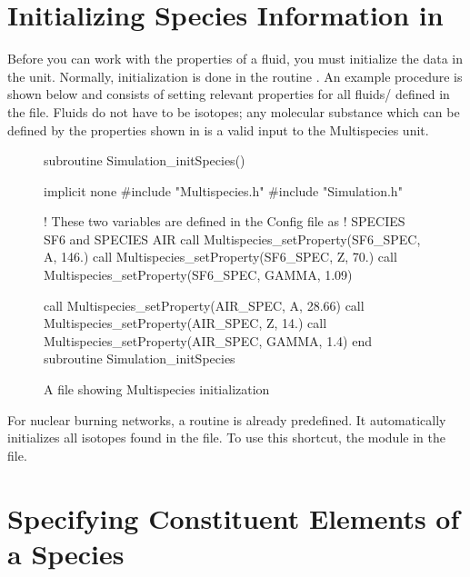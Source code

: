 \section{Initializing Species Information in }
\label{Sec:init_species}
Before you can work with the properties of a fluid, you must
initialize the data in the  unit.  Normally,
initialization is done in the routine
.  An example procedure is
shown below and consists of setting relevant properties for all
fluids/ defined in the  file.  Fluids do not have to be isotopes; any molecular
substance which can be defined by the properties shown in
 is a valid input to the
Multispecies unit.

\begin{figure}
 \begin{shrink}
  \begin{codeseg}
  subroutine Simulation_initSpecies()

implicit none
#include "Multispecies.h"
#include "Simulation.h"

! These two variables are defined in the Config file as
! SPECIES SF6 and SPECIES AIR
  call Multispecies_setProperty(SF6_SPEC, A, 146.)
  call Multispecies_setProperty(SF6_SPEC, Z, 70.)
  call Multispecies_setProperty(SF6_SPEC, GAMMA, 1.09)

  call Multispecies_setProperty(AIR_SPEC, A, 28.66)
  call Multispecies_setProperty(AIR_SPEC, Z, 14.)
  call Multispecies_setProperty(AIR_SPEC, GAMMA, 1.4)
end subroutine Simulation_initSpecies
\end{codeseg}
\end{shrink}
\caption{A  file showing Multispecies initialization}
\label{Fig:MultispeciesInit}
\end{figure}


\begin{flashtip}
For nuclear burning networks, a  routine is already predefined.  It automatically initializes all isotopes found in the  file.  To use this shortcut,  the module  in the  file.
\end{flashtip}

\section{Specifying Constituent Elements of a Species}
\label{Sec:constelems}

